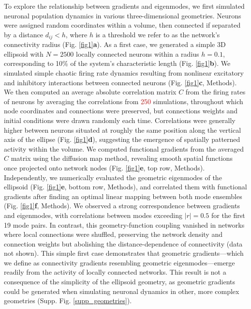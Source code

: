 \documentclass{article}
\begin{document}
To explore the relationship between gradients and eigenmodes, we first simulated neuronal population dynamics in various three-dimensional geometries. Neurons were assigned random coordinates within a volume, then connected if separated by a distance $d_{ij}<h$, where $h$ is a threshold we refer to as the network's connectivity radius (Fig. \ref{fig1}\textbf{a}). As a first case, we generated a simple 3D ellipsoid with $N=2500$ locally connected neurons within a radius $h=0.1$, corresponding to 10\% of the system’s characteristic length (Fig. \ref{fig1}\textbf{b}). We simulated simple chaotic firing rate dynamics resulting from nonlinear excitatory and inhibitory interactions between connected neurons (Fig. \ref{fig1}\textbf{c}, Methods). We then computed an average absolute correlation matrix $C$ from the firing rates of neurons by averaging the correlations from \textcolor{red}{250} simulations, throughout which node coordinates and connections were preserved, but connections weights and initial conditions were drawn randomly each time. Correlations were generally higher between neurons situated at roughly the same position along the vertical axis of the ellipse (Fig. \ref{fig1}\textbf{d}), suggesting the emergence of spatially patterned activity within the volume. We computed functional gradients from the averaged $C$ matrix using the diffusion map method\cite{Coifman2006}, revealing smooth spatial functions once projected onto network nodes (Fig. \ref{fig1}\textbf{e}, top row, Methods). Independently, we numerically evaluated the geometric eigenmodes of the ellipsoid (Fig. \ref{fig1}\textbf{e}, bottom row, Methods), and correlated them with functional gradients after finding an optimal linear mapping between both mode ensembles (Fig. \ref{fig1}\textbf{f}, Methods). We observed a strong correspondence between gradients and eigenmodes, with correlations between modes exceeding $|r|=0.5$ for the first 19 mode pairs. In contrast, this geometry-function coupling vanished in networks where local connections were shuffled, preserving the network density and connection weights but abolishing the distance-dependence of connectivity (data not shown). This simple first case demonstrates that geometric gradients---which we define as connectivity gradients resembling geometric eigenmodes---emerge readily from the activity of locally connected networks. This result is not a consequence of the simplicity of the ellipsoid geometry, as geometric gradients could be generated when simulating neuronal dynamics in other, more complex geometries (Supp. Fig. \ref{supp_geometries}). 
\end{document}

